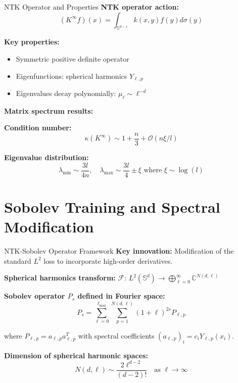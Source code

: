 \documentclass{beamer}
\begin{document}
\begin{frame}{NTK Operator and Properties}
\textbf{NTK operator action:}
\[
(K^{\infty} f)(x) = \int_{\mathbb{S}^{d-1}} k(x,y)f(y)d\sigma(y)
\]

\textbf{Key properties:}
\begin{itemize}
\item Symmetric positive definite operator
\item Eigenfunctions: spherical harmonics $Y_{\ell,p}$
\item Eigenvalues decay polynomially: $\mu_\ell \sim \ell^{-d}$
\end{itemize}

\textbf{Matrix spectrum results:}

\textbf{Condition number:}
\[ \kappa(K^{\infty}) \sim 1 + \frac{n}{3} + \mathcal{O}(n \xi / l) \]

\textbf{Eigenvalue distribution:}
\[ \lambda_{\text{min}} \sim \frac{3l}{4n}, \quad \lambda_{\text{max}} \sim \frac{3l}{4} \pm \xi \text{ where } \xi \sim \log(l) \]
\end{frame}

\section{Sobolev Training and Spectral Modification}

\begin{frame}{NTK-Sobolev Operator Framework}
\textbf{Key innovation:} Modification of the standard $L^2$ loss to incorporate high-order derivatives.

\textbf{Spherical harmonics transform:} $\mathcal{F}$: $L^2(\mathbb{S}^d) \to \bigoplus_{\ell=0}^{\infty} \mathbb{C}^{N(d,\ell)}$

\textbf{Sobolev operator $P_s$ defined in Fourier space:}
\[ P_s = \sum_{\ell=0}^{\ell_{\max}} \sum_{p=1}^{N(d,\ell)} (1+\ell)^{2s}P_{\ell,p} \]

where $P_{\ell,p} = a_{\ell,p}a_{\ell,p}^T$ with spectral coefficients $(a_{\ell,p})_i = c_iY_{\ell,p}(x_i)$.

\textbf{Dimension of spherical harmonic spaces:}
\[ N(d,\ell) \sim \frac{2\ell^{d-2}}{(d-2)!} \quad \text{as } \ell \to \infty \]
\end{frame}
\end{document}
